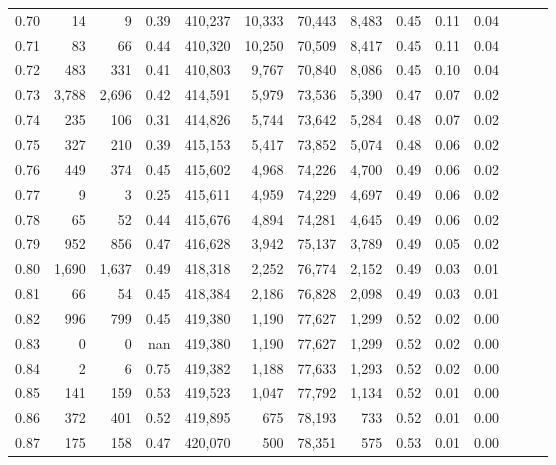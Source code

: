 \begin{tabular}{rrrrrrrrrrrrrr}
0.70 &      14 &      9 &  0.39 &  410,237 &   10,333 &  70,443 &   8,483 &  0.45 &  0.11 &      0.04 \\
0.71 &      83 &     66 &  0.44 &  410,320 &   10,250 &  70,509 &   8,417 &  0.45 &  0.11 &      0.04 \\
0.72 &     483 &    331 &  0.41 &  410,803 &    9,767 &  70,840 &   8,086 &  0.45 &  0.10 &      0.04 \\
0.73 &   3,788 &  2,696 &  0.42 &  414,591 &    5,979 &  73,536 &   5,390 &  0.47 &  0.07 &      0.02 \\
0.74 &     235 &    106 &  0.31 &  414,826 &    5,744 &  73,642 &   5,284 &  0.48 &  0.07 &      0.02 \\
0.75 &     327 &    210 &  0.39 &  415,153 &    5,417 &  73,852 &   5,074 &  0.48 &  0.06 &      0.02 \\
0.76 &     449 &    374 &  0.45 &  415,602 &    4,968 &  74,226 &   4,700 &  0.49 &  0.06 &      0.02 \\
0.77 &       9 &      3 &  0.25 &  415,611 &    4,959 &  74,229 &   4,697 &  0.49 &  0.06 &      0.02 \\
0.78 &      65 &     52 &  0.44 &  415,676 &    4,894 &  74,281 &   4,645 &  0.49 &  0.06 &      0.02 \\
0.79 &     952 &    856 &  0.47 &  416,628 &    3,942 &  75,137 &   3,789 &  0.49 &  0.05 &      0.02 \\
0.80 &   1,690 &  1,637 &  0.49 &  418,318 &    2,252 &  76,774 &   2,152 &  0.49 &  0.03 &      0.01 \\
0.81 &      66 &     54 &  0.45 &  418,384 &    2,186 &  76,828 &   2,098 &  0.49 &  0.03 &      0.01 \\
0.82 &     996 &    799 &  0.45 &  419,380 &    1,190 &  77,627 &   1,299 &  0.52 &  0.02 &      0.00 \\
0.83 &       0 &      0 &   nan &  419,380 &    1,190 &  77,627 &   1,299 &  0.52 &  0.02 &      0.00 \\
0.84 &       2 &      6 &  0.75 &  419,382 &    1,188 &  77,633 &   1,293 &  0.52 &  0.02 &      0.00 \\
0.85 &     141 &    159 &  0.53 &  419,523 &    1,047 &  77,792 &   1,134 &  0.52 &  0.01 &      0.00 \\
0.86 &     372 &    401 &  0.52 &  419,895 &      675 &  78,193 &     733 &  0.52 &  0.01 &      0.00 \\
0.87 &     175 &    158 &  0.47 &  420,070 &      500 &  78,351 &     575 &  0.53 &  0.01 &      0.00 \\

\end{tabular}
